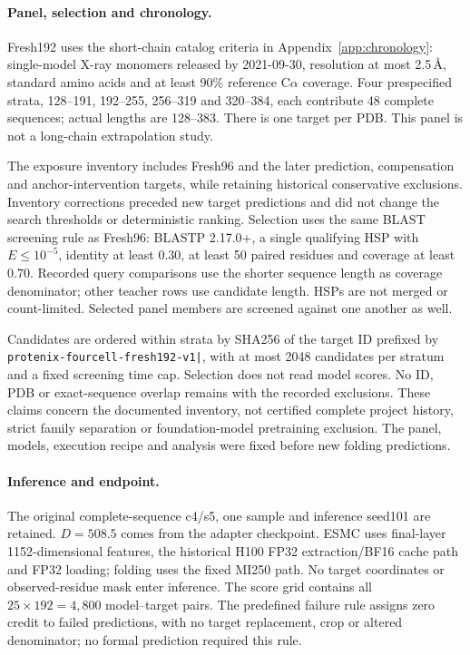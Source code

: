 \paragraph{Panel, selection and chronology.}
Fresh192 uses the short-chain catalog criteria in Appendix~\ref{app:chronology}:
single-model X-ray monomers released by 2021-09-30, resolution at most
2.5\,\AA, standard amino acids and at least 90\% reference C$\alpha$ coverage.
Four prespecified strata, 128--191, 192--255, 256--319 and 320--384, each
contribute 48 complete sequences; actual lengths are 128--383. There is one
target per PDB. This panel is not a long-chain extrapolation study.

The exposure inventory includes Fresh96 and the later prediction,
compensation and anchor-intervention targets, while retaining historical
conservative exclusions. Inventory corrections preceded new target predictions
and did not change the search thresholds or deterministic ranking. Selection
uses the same BLAST screening rule as Fresh96:
BLASTP 2.17.0+, a single qualifying HSP with $E\le10^{-5}$, identity at least
0.30, at least 50 paired residues and coverage at least 0.70. Recorded query
comparisons use the shorter sequence length as coverage denominator; other
teacher rows use candidate length. HSPs are not merged or count-limited.
Selected panel members are screened against one another as well.

Candidates are ordered within strata by SHA256 of the target ID prefixed
by \texttt{protenix-fourcell-fresh192-v1|}, with at most 2048
candidates per stratum and a fixed screening time cap. Selection does not
read model scores. No ID, PDB or exact-sequence overlap remains with the
recorded exclusions. These claims concern the documented inventory, not
certified complete project history, strict family separation or foundation-model
pretraining exclusion. The panel, models, execution recipe and analysis were
fixed before new folding predictions.

\paragraph{Inference and endpoint.}
The original complete-sequence c4/s5, one sample and inference seed101 are
retained. $D=508.5$ comes from the adapter checkpoint. ESMC uses final-layer
1152-dimensional features, the historical H100 FP32 extraction/BF16 cache
path and FP32 loading; folding uses the fixed MI250 path. No target coordinates
or observed-residue mask enter inference. The score grid contains all
$25\times192=4,800$ model--target pairs. The predefined failure rule assigns
zero credit to failed predictions, with no target replacement, crop or altered
denominator; no formal prediction required this rule.

